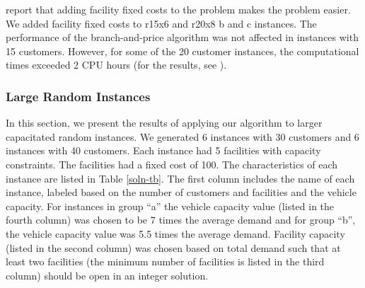 \documentclass[graybox]{./styles/svmult}
\begin{document}
\citet{Laporte86} report that adding facility fixed costs to the
problem makes the problem easier. We added facility fixed costs to
r15x6 and r20x8 b and c instances. The performance of the
branch-and-price algorithm was not affected in instances with 15
customers. However, for some of the 20 customer instances, the
computational times exceeded 2 CPU hours (for the results, see
\citet{Akca2}).


\subsubsection{Large Random Instances}
In this section, we present the results of applying our algorithm to
larger capacitated random instances. We generated 6 instances with 30
customers and 6 instances with 40 customers. Each instance had 5
facilities with capacity constraints. The facilities had a fixed cost
of 100. The characteristics of each instance are listed in Table
\ref{soln-tb}. The first column includes the name of each instance,
labeled based on the number of customers and facilities and the
vehicle capacity. For instances in group ``a'' the vehicle capacity
value (listed in the fourth column) was chosen to be 7 times the
average demand and for group ``b'', the vehicle capacity value was 5.5
times the average demand. Facility capacity (listed in the second
column) was chosen based on total demand such that at least two
facilities (the minimum number of facilities is listed in the third
column) should be open in an integer solution.
\end{document}
